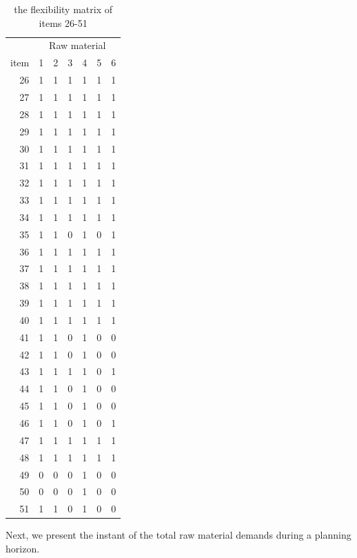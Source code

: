 \documentclass[preprint, 3p,
authoryear]{elsarticle} %
\begin{document}
\begin{table}[!h]

\caption{\label{tab:unnamed-chunk-6}the flexibility matrix of items 26-51}
\centering
\begin{tabular}[t]{r|r|r|r|r|r|r}
\hline
\multicolumn{1}{c|}{ } & \multicolumn{6}{c}{Raw material} \\
\cline{2-7}
item & 1 & 2 & 3 & 4 & 5 & 6\\
\hline
26 & 1 & 1 & 1 & 1 & 1 & 1\\
\hline
27 & 1 & 1 & 1 & 1 & 1 & 1\\
\hline
28 & 1 & 1 & 1 & 1 & 1 & 1\\
\hline
29 & 1 & 1 & 1 & 1 & 1 & 1\\
\hline
30 & 1 & 1 & 1 & 1 & 1 & 1\\
\hline
31 & 1 & 1 & 1 & 1 & 1 & 1\\
\hline
32 & 1 & 1 & 1 & 1 & 1 & 1\\
\hline
33 & 1 & 1 & 1 & 1 & 1 & 1\\
\hline
34 & 1 & 1 & 1 & 1 & 1 & 1\\
\hline
35 & 1 & 1 & 0 & 1 & 0 & 1\\
\hline
36 & 1 & 1 & 1 & 1 & 1 & 1\\
\hline
37 & 1 & 1 & 1 & 1 & 1 & 1\\
\hline
38 & 1 & 1 & 1 & 1 & 1 & 1\\
\hline
39 & 1 & 1 & 1 & 1 & 1 & 1\\
\hline
40 & 1 & 1 & 1 & 1 & 1 & 1\\
\hline
41 & 1 & 1 & 0 & 1 & 0 & 0\\
\hline
42 & 1 & 1 & 0 & 1 & 0 & 0\\
\hline
43 & 1 & 1 & 1 & 1 & 0 & 1\\
\hline
44 & 1 & 1 & 0 & 1 & 0 & 0\\
\hline
45 & 1 & 1 & 0 & 1 & 0 & 0\\
\hline
46 & 1 & 1 & 0 & 1 & 0 & 1\\
\hline
47 & 1 & 1 & 1 & 1 & 1 & 1\\
\hline
48 & 1 & 1 & 1 & 1 & 1 & 1\\
\hline
49 & 0 & 0 & 0 & 1 & 0 & 0\\
\hline
50 & 0 & 0 & 0 & 1 & 0 & 0\\
\hline
51 & 1 & 1 & 0 & 1 & 0 & 0\\
\hline
\end{tabular}
\end{table}

Next, we present the instant of the total raw material demands during a
planning horizon.
\end{document}
